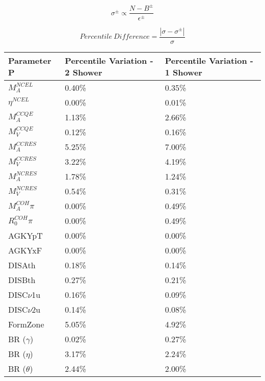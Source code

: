 \documentclass{article}
\begin{document}
\begin{equation} \label{eq:genie_xsec_var}
  \sigma^\pm \propto \frac{N - B^\pm}{\epsilon^\pm} 
\end{equation}

\begin{equation} \label{eq:genie_xsec_percentdiff}
  Percentile\ Difference = \frac{| \sigma - \sigma^\pm |}{\sigma} 
\end{equation}

\begin{table*}
\centering
{}
 \begin{tabular}{| l | l | l |}
 \hline
  Parameter P & Percentile Variation - 2 Shower & Percentile Variation - 1 Shower  \\ [0.1ex] \hline
$M_A^{NCEL}$ &  0.40\% & 0.35\% \\
$\eta^{NCEL}$  & 0.00\% & 0.01\% \\
$M_A^{CCQE}$  & 1.13\% & 2.66\% \\
$M_V^{CCQE}$  & 0.12\% & 0.16\% \\
$M_A^{CCRES}$  & 5.25\% & 7.00\% \\
$M_V^{CCRES}$  & 3.22\% & 4.19\% \\
$M_A^{NCRES}$  & 1.78\% & 1.24\% \\
$M_V^{NCRES}$  & 0.54\% & 0.31\%\\
$M_A^{COH}\pi$  & 0.00\% & 0.49\% \\
$R_0^{COH}\pi$  & 0.00\% & 0.49\%\\

AGKYpT & 0.00\% & 0.00\% \\
AGKYxF & 0.00\% & 0.00\% \\
DISAth & 0.18\% & 0.14\% \\
DISBth & 0.27\% & 0.21\% \\
DISC$\nu$1u & 0.16\% & 0.09\% \\
DISC$\nu$2u & 0.14\% & 0.08\% \\ \hline

FormZone  & 5.05\% & 4.92\% \\
BR ($\gamma$)  & 0.02\% & 0.27\% \\
BR ($\eta$)  & 3.17\% & 2.24\% \\
BR ($\theta$)  & 2.44\% & 2.00\% \\ \hline


\end{tabular}
\end{table*}
\end{document}
